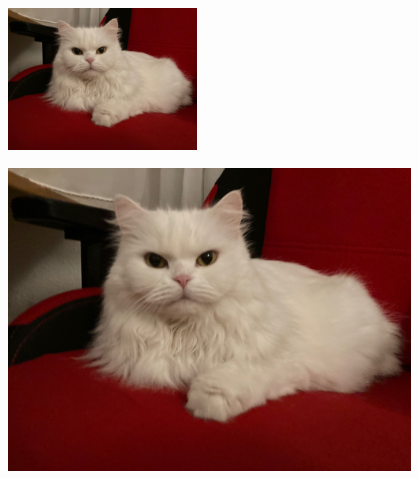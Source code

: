 \documentclass[12pt,ngerman,parskip=full]{scrreprt}
\begin{document}
\blindtext[2]  

\includegraphics[width=5cm]{Bilder/Katze2}

\begin{center}
{\includegraphics[width=0.8\textwidth]{Bilder/Katze2}}
\end{center}
\end{document}
